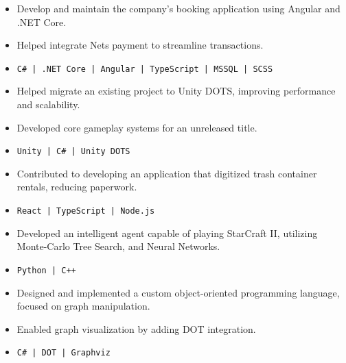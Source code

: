\documentclass[10pt,a4paper,withhyper]{altacv}
\begin{document}
\begin{paracol}{2}

\begin{itemize}
\item Develop and maintain the company's booking application using Angular and .NET Core. 
\item Helped integrate Nets payment to streamline transactions.
\item[] \color{black}\texttt{C\# | .NET Core | Angular | TypeScript | MSSQL | SCSS}
\end{itemize}

\divider

\begin{itemize}
\item Helped migrate an existing project to Unity DOTS, improving performance and scalability.
\item Developed core gameplay systems for an unreleased title.
\item[] \color{black}\texttt{Unity | C\# | Unity DOTS}
\end{itemize}

\divider

\begin{itemize}
\item Contributed to developing an application that digitized trash container rentals, reducing paperwork.
\item[] \color{black}\texttt{React | TypeScript | Node.js}
\end{itemize}


\begin{itemize}
\item Developed an intelligent agent capable of playing StarCraft II, utilizing Monte-Carlo Tree Search, and Neural Networks.
\item[] \color{black}\texttt{Python | C++}
\end{itemize}

\divider

\begin{itemize}
\item Designed and implemented a custom object-oriented programming language, focused on graph manipulation.
\item Enabled graph visualization by adding DOT integration.
\item[] \color{black}\texttt{C\# | DOT | Graphviz}
\end{itemize}


\end{paracol}
\end{document}
